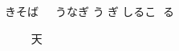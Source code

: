 \documentclass[12pt]{article}
\begin{document}
\thispagestyle{empty}

きそば
𛀥𛁛𛂦゙
うなぎ
う𛂁ぎ
しるこ
𛁈る𛀸

𛁋𛁅
てんぷら
天𛂱゚𛃭
すし

\printindex
\end{document}

